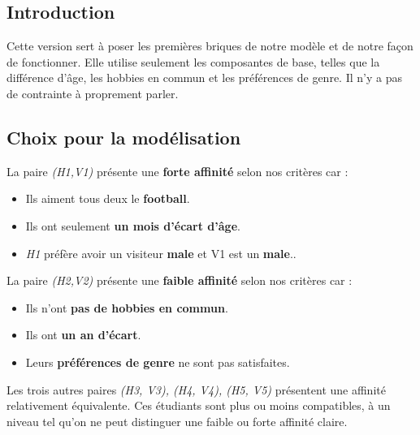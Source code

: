 \documentclass{mytex}
\begin{document}
\subsection {Introduction}

Cette version sert à poser les premières briques de notre modèle et de notre façon de fonctionner. Elle utilise seulement les composantes de base, telles que la différence d'âge, les hobbies en commun et les préférences de genre. Il n'y a pas de contrainte à proprement parler.

\subsection{Choix pour la modélisation}



La paire \emph{(H1,V1)} présente une \textbf{forte affinité} selon nos critères car :

\begin{itemize}
    \item Ils aiment tous deux le \textbf{football}.
    \item Ils ont seulement \textbf{un mois d'écart d'âge}.
    \item \emph{H1} préfère avoir un visiteur \textbf{male} et V1 est un \textbf{male}..
\end{itemize}


La paire \emph{(H2,V2)} présente une \textbf{faible affinité} selon nos critères car :

\begin{itemize}
    \item Ils n'ont \textbf{pas de hobbies en commun}.
    \item Ils ont \textbf{un an d'écart}.
    \item Leurs \textbf{préférences de genre} ne sont pas satisfaites.
\end{itemize}


Les trois autres paires  \emph{(H3, V3), (H4, V4), (H5, V5)} présentent une affinité relativement équivalente.
Ces étudiants sont plus ou moins compatibles, à un niveau tel qu'on ne peut distinguer une faible ou forte affinité claire.
\end{document}
